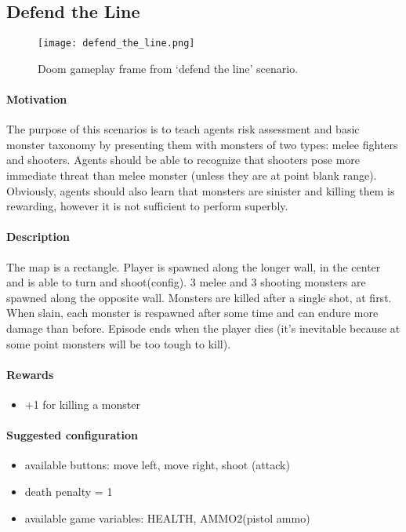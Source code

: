 	\subsection{Defend the Line}
		\begin{figure}
			\centering
			\texttt{[image: defend\_the\_line.png]}
			\caption{Doom gameplay frame from `defend the line' scenario.}\label{fig:defend_the_line}
		\end{figure}
		\paragraph{Motivation} 
			The purpose of this scenarios is to teach agents risk assessment and basic monster taxonomy by presenting them with monsters of two types: melee fighters and shooters. Agents should be able to recognize that shooters pose more immediate threat than melee monster (unless they are at point blank range). Obviously, agents should also learn that monsters are sinister and killing them is rewarding, however it is not sufficient to perform superbly.
		\paragraph{Description}
			The map is a rectangle. Player is spawned along the longer wall, in the center and is able to turn and shoot(config). 3 melee and 3 shooting monsters are spawned along the opposite wall. Monsters are killed after a single shot, at first. When slain, each monster is respawned after some time and can endure more damage than before. Episode ends when the player dies (it's inevitable because at some point monsters will be too tough to kill).
		\paragraph{Rewards}
			\begin{itemize}
				\item +1 for killing a monster
			\end{itemize}

		\paragraph{Suggested configuration}
			\begin{itemize}
				\item available buttons: move left, move right, shoot (attack)
				\item death penalty = 1
				\item available game variables: HEALTH, AMMO2(pistol ammo)
			\end{itemize}
	\newpage

